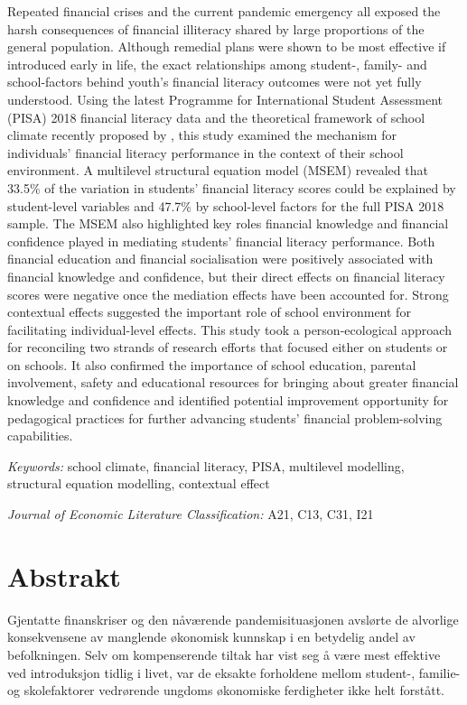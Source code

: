 \documentclass[a4paper,11pt,UKenglish,twoside,openright]{report}\usepackage[]{graphicx}\usepackage[]{color}
\begin{document}
\noindent Repeated financial crises and the current pandemic emergency all exposed the harsh consequences of financial illiteracy shared by large proportions of the general population. Although remedial plans were shown to be most effective if introduced early in life, the exact relationships among student-, family- and school-factors behind youth's financial literacy outcomes were not yet fully understood. Using the latest Programme for International Student Assessment (PISA) 2018 financial literacy data and the theoretical framework of school climate recently proposed by \textcite{wang:2016}, this study examined the mechanism for individuals' financial literacy performance in the context of their school environment. A multilevel structural equation model (MSEM) revealed that 33.5\% of the variation in students' financial literacy scores could be explained by student-level variables and 47.7\% by school-level factors for the full PISA 2018 sample. The MSEM also highlighted key roles financial knowledge and financial confidence played in mediating students' financial literacy performance. Both financial education and financial socialisation were positively associated with financial knowledge and confidence, but their direct effects on financial literacy scores were negative once the mediation effects have been accounted for. Strong contextual effects suggested the important role of school environment for facilitating individual-level effects. This study took a person-ecological approach for reconciling two strands of research efforts that focused either on students or on schools. It also confirmed the importance of school education, parental involvement, safety and educational resources for bringing about greater financial knowledge and confidence and identified potential improvement opportunity for pedagogical practices for further advancing students' financial problem-solving capabilities.

\textit{Keywords:} school climate, financial literacy, PISA, multilevel modelling, structural equation modelling, contextual effect

\textit{Journal of Economic Literature Classification:} A21, C13, C31, I21
\setcounter{page}{8}


\chapter*{Abstrakt}
\label{Ab.2}

\noindent Gjentatte finanskriser og den nåværende pandemisituasjonen avslørte de alvorlige konsekvensene av manglende økonomisk kunnskap i en betydelig andel av befolkningen. Selv om kompenserende tiltak har vist seg å være mest effektive ved introduksjon tidlig i livet, var de eksakte forholdene mellom student-, familie- og skolefaktorer vedrørende ungdoms økonomiske ferdigheter ikke helt forstått.
\end{document}
